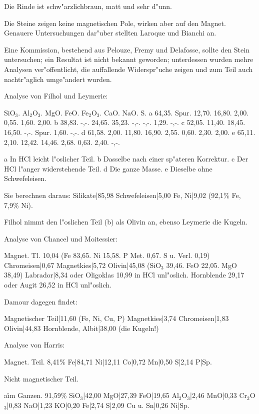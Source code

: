 \documentclass[a4paper, 11pt, oneside]{article}
\begin{document}
Die Rinde ist schw"arzlichbraun, matt und sehr d"unn.

Die Steine zeigen keine magnetischen Pole, wirken aber auf den Magnet. Genauere Untersuchungen dar"uber stellten Laroque und Bianchi an.

Eine Kommission, bestehend aus Pelouze, Fremy und Delafosse, sollte den Stein untersuchen; ein Resultat ist nicht bekannt geworden; unterdessen wurden mehre Analysen ver"offentlicht, die auffallende Widerspr"uche zeigen und zum Teil auch nachtr"aglich umge"andert wurden.

Analyse von Filhol und Leymerie:

SiO$_{3}$. Al$_{2}$O$_{3}$. MgO. FeO. Fe$_{2}$O$_{3}$. CaO. NaO. S.  
a 64,35. Spur. 12,70. 16,80. 2,00. 0,55. 1,60. 2,00.  
b 38,83. -,-. 24,65. 35,23. -,-. -,-. 1,29. -,-.  
c 52,05. 11,40. 18,45. 16,50. -,-. Spur. 1,60. -,-.  
d 61,58. 2,00. 11,80. 16,90. 2,55. 0,60. 2,30. 2,00.  
e 65,11. 2,10. 12,42. 14,46. 2,68. 0,63. 2,40. -,-.  

a In HCl leicht l"oslicher Teil. b Dasselbe nach einer sp"ateren Korrektur. c Der HCl l"anger widerstehende Teil. d Die ganze Masse. e Dieselbe ohne Schwefeleisen.

Sie berechnen daraus:  
Silikate|85,98  
Schwefeleisen|5,00  
Fe, Ni|9,02 (92,1\% Fe, 7,9\% Ni).

Filhol nimmt den l"oslichen Teil (b) als Olivin an, ebenso Leymerie die Kugeln.

Analyse von Chancel und Moitessier:

Magnet. Tl. 10,04 (Fe 83,65. Ni 15,58. P Met. 0,67. S u. Verl. 0,19)  
Chromeisen|0,67  
Magnetkies|5,72  
Olivin|45,08 (SiO$_{3}$ 39,46. FeO 22,05. MgO 38,49)  
Labrador|8,34 oder Oligoklas 10,99 in HCl unl"oslich.  
Hornblende 29,17 oder Augit 26,52 in HCl unl"oslich.

Damour dagegen findet:

Magnetischer Teil|11,60 (Fe, Ni, Cu, P)  
Magnetkies|3,74  
Chromeisen|1,83  
Olivin|44,83  
Hornblende, Albit|38,00 (die Kugeln!)

Analyse von Harris:

Magnet. Teil. 8,41\%  
Fe|84,71  
Ni|12,11  
Co|0,72  
Mn|0,50  
S|2,14  
P|Sp.

Nicht magnetischer Teil.

a\. im Ganzen. 91,59\%
SiO$_{3}$|42,00  
MgO|27,39  
FeO|19,65  
Al$_{2}$O$_{3}$|2,46  
MnO|0,33  
Cr$_{2}$O$_{3}$|0,83  
NaO|1,23  
KO|0,20  
Fe|2,74  
S|2,09  
Cu u. Sn|0,26  
Ni|Sp.
\end{document}
